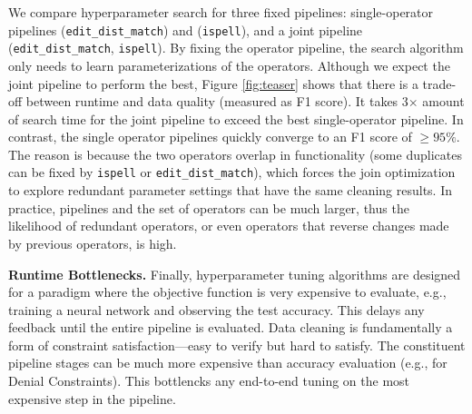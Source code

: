 We compare hyperparameter search for three fixed pipelines:  single-operator pipelines (\texttt{edit\_dist\_match}) and (\texttt{ispell}), and a joint pipeline (\texttt{edit\_dist\_match}, \texttt{ispell}).  By fixing the operator pipeline, the search algorithm only needs to learn parameterizations of the operators.  Although we expect the joint pipeline to perform the best, Figure \ref{fig:teaser} shows that there is a trade-off between runtime and data quality (measured as F1 score).  It takes 3$\times$ amount of search time for the joint pipeline to exceed the best single-operator pipeline.    In contrast, the single operator pipelines quickly converge to an F1 score of $\ge95\%$.  The reason is because the two operators overlap in functionality (some duplicates can be fixed by \texttt{ispell} or \texttt{edit\_dist\_match}), which forces the join optimization to explore redundant parameter settings that have the same cleaning results.  In practice, pipelines and the set of operators can be much larger, thus the likelihood of redundant operators, or even operators that reverse changes made by previous operators, is high.


\vspace{0.5em}
\noindent \textbf{Runtime Bottlenecks. } Finally, hyperparameter tuning algorithms are designed for a paradigm where the objective function is very expensive to evaluate, e.g., training a neural network and observing the test accuracy. This delays any feedback until the entire pipeline is evaluated. Data cleaning is fundamentally a form of constraint satisfaction---easy to verify but hard to satisfy.
The constituent pipeline stages can be much more expensive than accuracy evaluation (e.g., for Denial Constraints).
This bottlencks any end-to-end tuning on the most expensive step in the pipeline.






